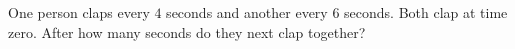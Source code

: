 One person claps every $4$ seconds and another every $6$ seconds. Both clap at time zero. After how many seconds do they next clap together?
